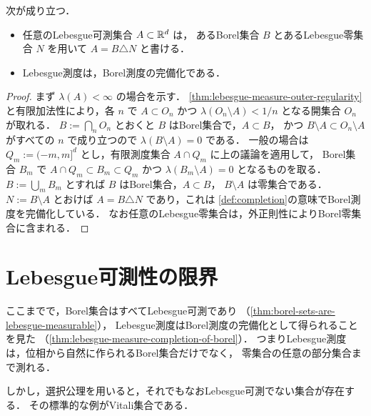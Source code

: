 \begin{theorem}\label{thm:lebesgue-measure-completion-of-borel}
次が成り立つ．
\begin{itemize}
    \item 任意のLebesgue可測集合 $A\subset\mathbb R^d$ は，
    あるBorel集合 $B$ とあるLebesgue零集合 $N$ を用いて $A=B\triangle N$ と書ける．
    \item Lebesgue測度は，Borel測度の完備化である．
\end{itemize}
\end{theorem}
\begin{proof}
まず $\lambda(A)<\infty$ の場合を示す．
\cref{thm:lebesgue-measure-outer-regularity}と有限加法性により，各 $n$ で
$A\subset O_n$ かつ $\lambda(O_n\setminus A)<1/n$ となる開集合 $O_n$ が取れる．
$B:=\bigcap_n O_n$ とおくと $B$ はBorel集合で，$A\subset B$，
かつ $B\setminus A\subset O_n\setminus A$ がすべての $n$ で成り立つので
$\lambda(B\setminus A)=0$ である．
一般の場合は $Q_m:=(-m,m]^d$ とし，有限測度集合 $A\cap Q_m$ に上の議論を適用して，
Borel集合 $B_m$ で $A\cap Q_m\subset B_m\subset Q_m$ かつ
$\lambda(B_m\setminus A)=0$ となるものを取る．
$B:=\bigcup_m B_m$ とすれば $B$ はBorel集合，$A\subset B$，
$B\setminus A$ は零集合である．
$N:=B\setminus A$ とおけば $A=B\triangle N$ であり，これは
\cref{def:completion}の意味でBorel測度を完備化している．
なお任意のLebesgue零集合は，外正則性によりBorel零集合に含まれる．
\end{proof}

\section{Lebesgue可測性の限界}

ここまでで，Borel集合はすべてLebesgue可測であり
（\cref{thm:borel-sets-are-lebesgue-measurable}），
Lebesgue測度はBorel測度の完備化として得られることを見た
（\cref{thm:lebesgue-measure-completion-of-borel}）．
つまりLebesgue測度は，位相から自然に作られるBorel集合だけでなく，
零集合の任意の部分集合まで測れる．

しかし，選択公理を用いると，それでもなおLebesgue可測でない集合が存在する．
その標準的な例がVitali集合である．

